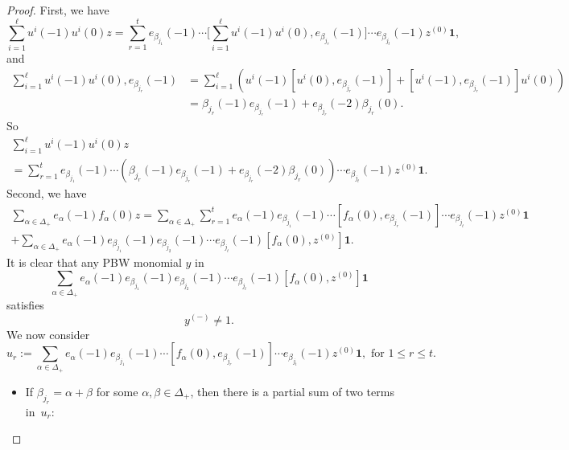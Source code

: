 \documentclass[JEP,XML,SOM,Unicode]{cedram}
\let\al\alpha
\let\be\beta
\theoremstyle{definition}
\begin{document}
\begin{proof}
First, we have\vspace*{-3pt}
\begin{equation*}
\sum_{i=1}^{\ell} u^i(-1)u^i(0) z
= \sum_{r=1}^t
e_{\be_{j_1}}(-1) \cdots \biggl[\sum_{i=1}^{\ell}u^i(-1)u^i(0), e_{\be_{j_r}}(-1)\biggr] \cdots e_{\be_{j_t}}(-1) z^{(0)} \mathbf{1},
\end{equation*}
and\vspace*{-3pt}
\begin{align*}
\sum_{i=1}^{\ell}u^i(-1)u^i(0), e_{\be_{j_r}}(-1)& = \sum_{i=1}^{\ell}\left(u^i(-1) [u^i(0), e_{\be_{j_r}}(-1)] + [u^i(-1), e_{\be_{j_r}}(-1)] u^i(0) \right)\\
& = \be_{j_r}(-1) e_{\be_{j_r}}(-1) + e_{\be_{j_r}}(-2) \be_{j_r}(0).
\end{align*}
So\vspace*{-5pt}
\begin{multline}\label{e37}
\sum_{i=1}^{\ell} u^i(-1)u^i(0) z\\[-8pt]
= \sum_{r=1}^t
e_{\be_{j_1}}(-1) \cdots (\be_{j_r}(-1) e_{\be_{j_r}}(-1) + e_{\be_{j_r}}(-2) \be_{j_r}(0)) \cdots e_{\be_{j_t}}(-1) z^{(0)} \mathbf{1}.
\end{multline}
Second, we have\vspace*{-5pt}
\begin{multline*}
\sum_{\al\in{\Delta}_+}e_{\al}(-1) f_{\al}(0) z
= \sum_{\al\in{\Delta}_+} \sum_{r=1}^te_{\al}(-1)
e_{\be_{j_1}}(-1) \cdots [f_{\al}(0),e_{\be_{j_r}}(-1)] \cdots e_{\be_{j_t}}(-1) z^{(0)} \mathbf{1} \\
+ \sum_{\al\in{\Delta}_+} e_{\al}(-1)e_{\be_{j_1}}(-1)e_{\be_{j_2}}(-1)\cdots e_{\be_{j_t}}(-1)
[f_{\al}(0),z^{(0)} ] \mathbf{1}.
\end{multline*}
It is clear that
any PBW monomial $y$ in\vspace*{-3pt}
\[
\sum_{\al\in{\Delta}_+}e_{\al}(-1) e_{\be_{j_1}}(-1)e_{\be_{j_2}}(-1)\cdots e_{\be_{j_t}}(-1)
[f_{\al}(0),z^{(0)} ] \mathbf{1}
\]
satisfies\vspace*{-3pt}
\begin{equation}\label{e38}
y^{(-)} \not= 1.
\end{equation}
We now consider
\[
u_r:=\sum_{\al\in{\Delta}_+}
e_{\al}(-1)e_{\be_{j_1}}(-1) \cdots [f_{\al}(0),e_{\be_{j_r}}(-1)] \cdots e_{\be_{j_t}}(-1) z^{(0)} \mathbf{1}, \text{ for } 1\leq r\leq t.
\]
\begin{itemize}
\item
If $\be_{j_r}=\al+\be$ for some $\al,\be\in\Delta_{+}$, then there is a partial sum of two terms in~$u_r$:

\end{itemize}
\end{proof}
\end{document}
